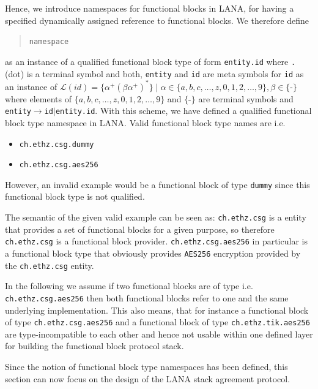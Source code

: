 \documentclass[times,10pt,twocolumn]{article}
\begin{document}
Hence, we introduce namespaces for functional blocks in LANA, for having a 
specified dynamically assigned reference to functional blocks. We therefore 
define
\begin{quote}\texttt{namespace}\end{quote}
as an instance of a qualified functional block type of form \texttt{entity.id}
where \texttt{.} (dot) is a terminal symbol and both, \texttt{entity} and
\texttt{id} are meta symbols for \texttt{id} as an instance of 
$\mathcal{L}(id)=\{\alpha^{+}(\beta\alpha^{+})^{*}\} \;\vert\; \alpha\in\{a,b,c,\ldots,z,0,1,2,\ldots,9\},\beta\in\{$-$\}$
where elements of $\{a,b,c,\ldots,z,0,1,2,\ldots,9\}$ and $\{$-$\}$ are terminal symbols
and \texttt{entity}$\rightarrow$\texttt{id}$|$\texttt{entity.id}. With this
scheme, we have defined a qualified functional block type namespace in LANA.
Valid functional block type names are i.e.
\begin{itemize}
        \setlength{\itemsep}{-1mm}
	\item \texttt{ch.ethz.csg.dummy}
	\item \texttt{ch.ethz.csg.aes256}
\end{itemize}
However, an invalid example would be a functional block of type \texttt{dummy}
since this functional block type is not qualified.\newline

The semantic of the given valid example can be seen as: \texttt{ch.ethz.csg}
is a entity that provides a set of functional blocks for a given purpose, so
therefore \texttt{ch.ethz.csg} is a functional block provider. 
\texttt{ch.ethz.csg.aes256} in particular is a functional block type that
obviously provides \texttt{AES256} encryption provided by the \texttt{ch.ethz.csg}
entity.\newline

In the following we assume if two functional blocks are of type i.e. 
\texttt{ch.ethz.csg.aes256} then both functional blocks refer to one and the 
same underlying implementation. This also means, that for instance a functional
block of type \texttt{ch.ethz.csg.aes256} and a functional block of type
\texttt{ch.ethz.tik.aes256} are type-incompatible to each other and hence not
usable within one defined layer for building the functional block protocol stack.

Since the notion of functional block type namespaces has been defined, this
section can now focus on the design of the LANA stack agreement protocol.\newline
\end{document}
